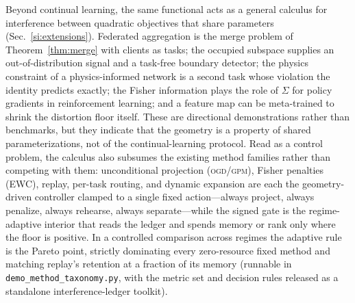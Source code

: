 \documentclass[10pt,a4paper]{article}
\theoremstyle{plain}
\theoremstyle{definition}
\newcommand{\Sig}{\Sigma}
\newcommand{\OGD}{\textsc{ogd}}
\begin{document}
Beyond continual learning, the same functional acts as a general calculus for interference
between quadratic objectives that share parameters (Sec.~\ref{si:extensions}). Federated
aggregation is the merge problem of Theorem~\ref{thm:merge} with clients as tasks; the
occupied subspace supplies an out-of-distribution signal and a task-free boundary detector;
the physics constraint of a physics-informed network is a second task whose violation the
identity predicts exactly; the Fisher information plays the role of $\Sig$ for policy
gradients in reinforcement learning; and a feature map can be meta-trained to shrink the
distortion floor itself. These are directional demonstrations rather than benchmarks, but
they indicate that the geometry is a property of shared parameterizations, not of the
continual-learning protocol. Read as a control problem, the calculus also subsumes the
existing method families rather than competing with them: unconditional projection
(\OGD{}/\textsc{gpm}), Fisher penalties (EWC), replay, per-task routing, and dynamic
expansion are each the geometry-driven controller clamped to a single fixed
action---always project, always penalize, always rehearse, always separate---while the
signed gate is the regime-adaptive interior that reads the ledger and spends memory or
rank only where the floor is positive. In a controlled comparison across regimes the
adaptive rule is the Pareto point, strictly dominating every zero-resource fixed method
and matching replay's retention at a fraction of its memory (runnable in
\texttt{demo\_method\_taxonomy.py}, with the metric set and decision rules released as a
standalone interference-ledger toolkit).
\end{document}
